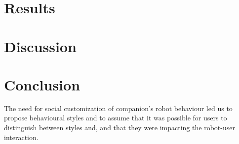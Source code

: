 \documentclass[a4paper,twocolumn]{svjour3}
\begin{document}
\section{Results}
%



\section{Discussion}
\section{Conclusion}
The need for social customization of companion's robot behaviour led us to propose behavioural styles and to assume that it was possible for users to distinguish between styles and, and that they were impacting the robot-user interaction.
\end{document}
